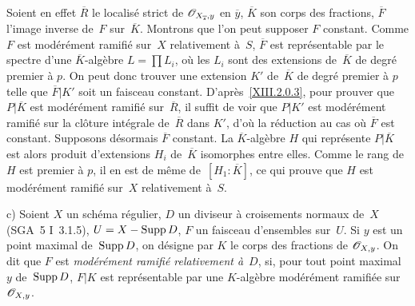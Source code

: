 \begin{remarques}
Soient en effet $\overline{R}$ le localis\'e strict de
$\cal{O}_{X_{\overline{s}},y}$ en $\overline{y}$, $\overline{K}$ son
corps des fractions, $\overline{F}$ l'image inverse de~$F$ sur~$\overline{K}$. Montrons que l'on peut supposer $F$ constant. Comme
$F$ est mod\'er\'ement ramifi\'e sur~$X$ relativement \`a~$S$,
$\overline{F}$ est repr\'esentable par le spectre d'une
$\overline{K}$-alg\`ebre $L=\prod L_i$, o\`u les $L_i$ sont des
extensions de~$\overline{K}$ de degr\'e premier \`a $p$. On peut
donc trouver une extension $K'$ de~$\overline{K}$ de degr\'e premier
\`a $p$ telle que $\overline{F}|K'$ soit un faisceau
constant. D'apr\`es~\ref{XIII.2.0.3}, pour prouver que
$P|\overline{K}$ est mod\'er\'ement ramifi\'e sur~$\overline{R}$, il suffit de voir que $P|K'$ est mod\'er\'ement
ramifi\'e sur la cl\^oture int\'egrale de~$\overline{R}$ dans
$K'$, d'o\`u la r\'eduction au cas o\`u $\overline{F}$ est
constant. Supposons d\'esormais $\overline{F}$ constant. La
$\overline{K}$-alg\`ebre $H$ qui repr\'esente $P|\overline{K}$ est
alors produit d'extensions $H_i$ de~$\overline{K}$ isomorphes entre
elles. Comme le rang de~$H$ est premier \`a $p$, il en est de
m\^eme de~$[H_1:\overline{K}]$, ce qui prouve que $H$ est
mod\'er\'ement ramifi\'e sur~$X$ relativement \`a~$S$.

c) Soient $X$ un sch\'ema r\'egulier, $D$ un diviseur \`a
croisements normaux de~$X$ (SGA~5 I~3.1.5), $U=X-\operatorname{Supp} D$, $F$ un
faisceau d'ensembles sur~$U$. Si $y$ est un point maximal de~$\operatorname{Supp}
D$, on d\'esigne par $K$ le corps des fractions de
$\cal{O}_{X,y}$. On dit que $F$ est \emph{modérément
ramifié relativement à}~$D$,
si, pour tout point maximal $y$ de~$\operatorname{Supp} D$, $F|K$ est
repr\'esentable par une $K$-alg\`ebre mod\'er\'ement
ramifi\'ee sur~$\cal{O}_{X,y}$.
\end{remarques}

